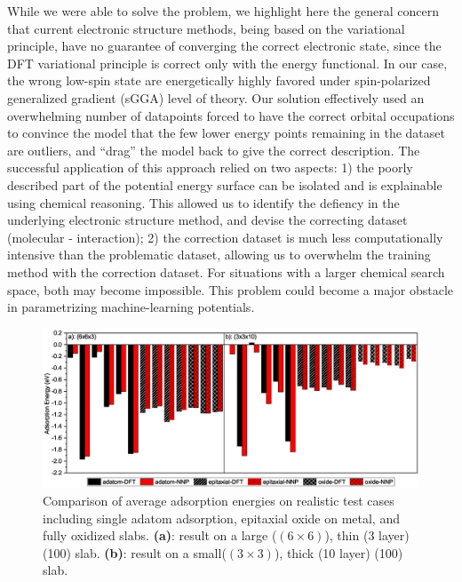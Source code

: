 \documentclass[manuscript=cmatex]{achemso}
\begin{document}
While we were able to solve the problem, we highlight here the general concern that current electronic structure methods, being based on the variational principle, have no guarantee of converging the correct electronic state, since the DFT variational principle is correct only with the energy functional. In our case, the wrong low-spin state are energetically highly favored under spin-polarized generalized gradient (sGGA) level of theory. Our solution effectively used an overwhelming number of datapoints forced to have the correct orbital occupations to convince the model that the few lower energy points remaining in the dataset are outliers, and ``drag'' the model back to give the correct description. The successful application of this approach relied on two aspects: 1) the poorly described part of the potential energy surface can be isolated and is explainable using chemical reasoning. This allowed us to identify the defiency in the underlying electronic structure method, and devise the correcting dataset (molecular - interaction); 2) the correction dataset is much less computationally intensive than the problematic dataset, allowing us to overwhelm the training method with the correction dataset. For situations with a larger chemical search space, both may become impossible. This problem could become a major obstacle in parametrizing machine-learning potentials. 

\begin{figure}[h]
  \centering
  \includegraphics[width=\textwidth]{val_ads}
  \caption[Comparison of adsorption energies calculated using DFT and NNP]{Comparison of average adsorption energies on realistic test cases including single adatom adsorption, epitaxial oxide on metal, and fully oxidized slabs. \textbf{(a)}: result on a large ($(6\times6)$), thin (3 layer) (100) slab. \textbf{(b)}: result on a small($(3\times3)$), thick (10 layer) (100) slab.} 
  \label{fig:val_ads}
\end{figure}
\end{document}
